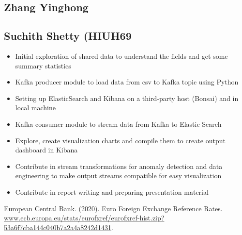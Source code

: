 \documentclass{article}
\begin{document}
\subsection{Zhang Yinghong}

\subsection{Suchith Shetty (HIUH69}
\begin{itemize}
    \item Initial exploration of shared data to understand the fields and get some summary statistics
    \item Kafka producer module to load data from csv to Kafka topic using Python
    \item Setting up ElasticSearch and Kibana on a third-party host (Bonsai) and in local machine
    \item Kafka consumer module to stream data from Kafka to Elastic Search
    \item Explore, create visualization charts and compile them to create output dashboard in Kibana
    \item Contribute in stream transformations for anomaly detection and data engineering to make output streams compatible for easy visualization
    \item Contribute in report writing and preparing presentation material
\end{itemize}


\begin{thebibliography}{9}

European Central Bank. (2020). Euro Foreign Exchange Reference Rates. \url{www.ecb.europa.eu/stats/eurofxref/eurofxref-hist.zip?53a6f7cba144c040b7a2a4a8242d1431}.

\end{thebibliography}
\end{document}
